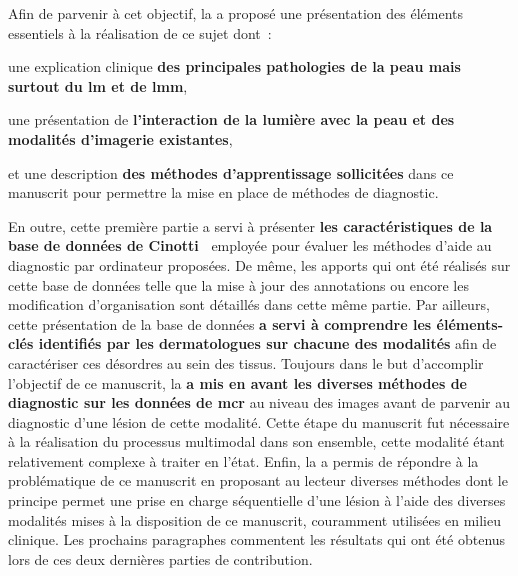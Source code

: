 Afin de parvenir à cet objectif, la  a proposé une présentation des éléments essentiels à la réalisation de ce sujet dont~:
\begin{inlinerate}
    \item une explication clinique \textbf{des principales pathologies de la peau mais surtout du \gls{lm} et de \gls{lmm}},
    \item une présentation de \textbf{l'interaction de la lumière avec la peau et des modalités d'imagerie existantes},
    \item et une description \textbf{des méthodes d'apprentissage sollicitées} dans ce manuscrit pour permettre la mise en place de méthodes de diagnostic.
\end{inlinerate} 
En outre, cette première partie a servi à présenter \textbf{les caractéristiques de la base de données de Cinotti~} employée pour évaluer les méthodes d'aide au diagnostic par ordinateur proposées. De même, les apports qui ont été réalisés sur cette base de données telle que la mise à jour des annotations ou encore les modification d'organisation sont détaillés dans cette même partie.
Par ailleurs, cette présentation de la base de données \textbf{a servi à comprendre les éléments-clés identifiés par les dermatologues sur chacune des modalités} afin de caractériser ces désordres au sein des tissus. Toujours dans le but d'accomplir l'objectif de ce manuscrit, la  \textbf{a mis en avant les diverses méthodes de diagnostic sur les données de \gls{mcr}} au niveau des images avant de parvenir au diagnostic d'une lésion de cette modalité. Cette étape du manuscrit fut nécessaire à la réalisation du processus multimodal dans son ensemble, cette modalité étant relativement complexe à traiter en l'état. Enfin, la  a permis de répondre à la problématique de ce manuscrit en proposant au lecteur diverses méthodes dont le principe permet une prise en charge séquentielle d'une lésion à l'aide des diverses modalités mises à la disposition de ce manuscrit, couramment utilisées en milieu clinique. Les prochains paragraphes commentent les résultats qui ont été obtenus lors de ces deux dernières parties de contribution.\par

